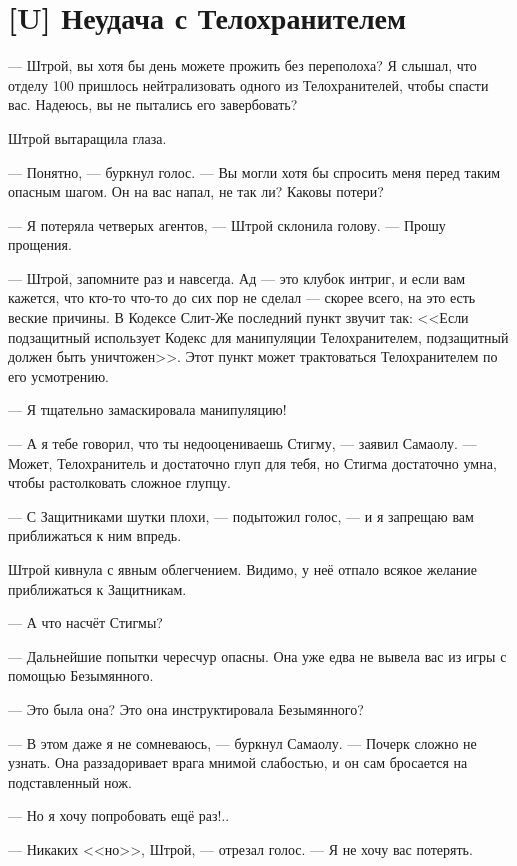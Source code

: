 \section{[U] Неудача с Телохранителем}

\textspace

--- Штрой, вы хотя бы день можете прожить без переполоха?
Я слышал, что отделу 100 пришлось нейтрализовать одного из Телохранителей, чтобы спасти вас.
Надеюсь, вы не пытались его завербовать?

Штрой вытаращила глаза.

--- Понятно, --- буркнул голос.
--- Вы могли хотя бы спросить меня перед таким опасным шагом.
Он на вас напал, не так ли?
Каковы потери?

--- Я потеряла четверых агентов, --- Штрой склонила голову.
--- Прошу прощения.

--- Штрой, запомните раз и навсегда.
Ад --- это клубок интриг, и если вам кажется, что кто-то что-то до сих пор не сделал --- скорее всего, на это есть веские причины.
В Кодексе Слит-Же последний пункт звучит так: <<Если подзащитный использует Кодекс для манипуляции Телохранителем, подзащитный должен быть уничтожен>>.
Этот пункт может трактоваться Телохранителем по его усмотрению.

--- Я тщательно замаскировала манипуляцию!

--- А я тебе говорил, что ты недооцениваешь Стигму, --- заявил Самаолу.
--- Может, Телохранитель и достаточно глуп для тебя, но Стигма достаточно умна, чтобы растолковать сложное глупцу.

--- С Защитниками шутки плохи, --- подытожил голос, --- и я запрещаю вам приближаться к ним впредь.

Штрой кивнула с явным облегчением.
Видимо, у неё отпало всякое желание приближаться к Защитникам.

--- А что насчёт Стигмы?

--- Дальнейшие попытки чересчур опасны.
Она уже едва не вывела вас из игры с помощью Безымянного.

--- Это была она?
Это она инструктировала Безымянного?

--- В этом даже я не сомневаюсь, --- буркнул Самаолу.
--- Почерк сложно не узнать.
Она раззадоривает врага мнимой слабостью, и он сам бросается на подставленный нож.

--- Но я хочу попробовать ещё раз!..

--- Никаких <<но>>, Штрой, --- отрезал голос.
--- Я не хочу вас потерять.


